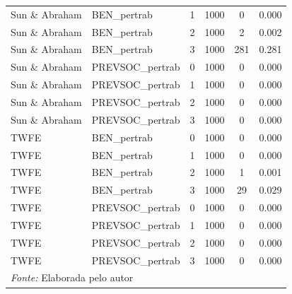 \documentclass[12pt,a4paper,oneside]{article}
\begin{document}
\begin{table}[H]
{\begin{tabular}{l l c c c c}
			Sun \& Abraham         & BEN\_pertrab     & 1 & 1000 & 0   & 0.000 \\
			Sun \& Abraham         & BEN\_pertrab     & 2 & 1000 & 2   & 0.002 \\
			Sun \& Abraham         & BEN\_pertrab     & 3 & 1000 & 281 & 0.281 \\
			Sun \& Abraham         & PREVSOC\_pertrab & 0 & 1000 & 0   & 0.000 \\
			Sun \& Abraham         & PREVSOC\_pertrab & 1 & 1000 & 0   & 0.000 \\
			Sun \& Abraham         & PREVSOC\_pertrab & 2 & 1000 & 0   & 0.000 \\
			Sun \& Abraham         & PREVSOC\_pertrab & 3 & 1000 & 0   & 0.000 \\
			TWFE                   & BEN\_pertrab     & 0 & 1000 & 0   & 0.000 \\
			TWFE                   & BEN\_pertrab     & 1 & 1000 & 0   & 0.000 \\
			TWFE                   & BEN\_pertrab     & 2 & 1000 & 1   & 0.001 \\
			TWFE                   & BEN\_pertrab     & 3 & 1000 & 29  & 0.029 \\
			TWFE                   & PREVSOC\_pertrab & 0 & 1000 & 0   & 0.000 \\
			TWFE                   & PREVSOC\_pertrab & 1 & 1000 & 0   & 0.000 \\
			TWFE                   & PREVSOC\_pertrab & 2 & 1000 & 0   & 0.000 \\
			TWFE                   & PREVSOC\_pertrab & 3 & 1000 & 0   & 0.000 \\
			\hline
			\multicolumn{6}{l}{\footnotesize \textit{Fonte:} Elaborada pelo autor} \\
		\end{tabular}%
	}
\end{table}
	
\end{document}
